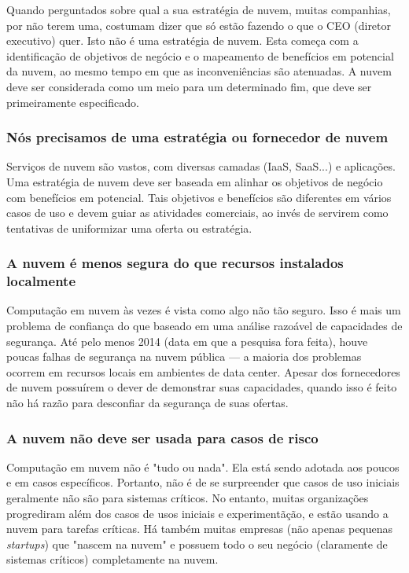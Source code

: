     Quando perguntados sobre qual a sua estratégia de nuvem, muitas companhias, por
    não terem uma, costumam dizer que só estão fazendo o que o CEO (diretor
    executivo) quer. Isto não é uma estratégia de nuvem. Esta começa com a 
    identificação de objetivos de negócio e o mapeamento de benefícios em potencial
    da nuvem, ao mesmo tempo em que as inconveniências são atenuadas. A nuvem deve
    ser considerada como um meio para um determinado fim, que deve ser primeiramente
    especificado.

    \subsubsection{Nós precisamos de uma estratégia ou fornecedor de nuvem}

    Serviços de nuvem são vastos, com diversas camadas (IaaS, SaaS...) e aplicações.
    Uma estratégia de nuvem deve ser baseada em alinhar os objetivos de negócio com
    benefícios em potencial. Tais objetivos e benefícios são diferentes em vários
    casos de uso e devem guiar as atividades comerciais, ao invés de servirem como
    tentativas de uniformizar uma oferta ou estratégia.

    \subsubsection{A nuvem é menos segura do que recursos instalados localmente}

    Computação em nuvem às vezes é vista como algo não tão seguro. Isso é mais um
    problema de confiança do que baseado em uma análise razoável de capacidades de
    segurança. Até pelo menos 2014 (data em que a pesquisa fora feita), houve poucas
    falhas de segurança na nuvem pública --- a maioria dos problemas ocorrem em
    recursos locais em ambientes de data center. Apesar dos fornecedores de nuvem
    possuírem o dever de demonstrar suas capacidades, quando isso é feito não há
    razão para desconfiar da segurança de suas ofertas.

    \subsubsection{A nuvem não deve ser usada para casos de risco}

    Computação em nuvem não é "tudo ou nada". Ela está sendo adotada aos poucos e em
    casos específicos. Portanto, não é de se surpreender que casos de uso iniciais
    geralmente não são para sistemas críticos. No entanto, muitas organizações
    progrediram além dos casos de usos iniciais e experimentãção, e estão usando a
    nuvem para tarefas críticas. Há também muitas empresas (não apenas pequenas
    \emph{startups}) que "nascem na nuvem" e possuem todo o seu negócio (claramente
    de sistemas críticos) completamente na nuvem.

